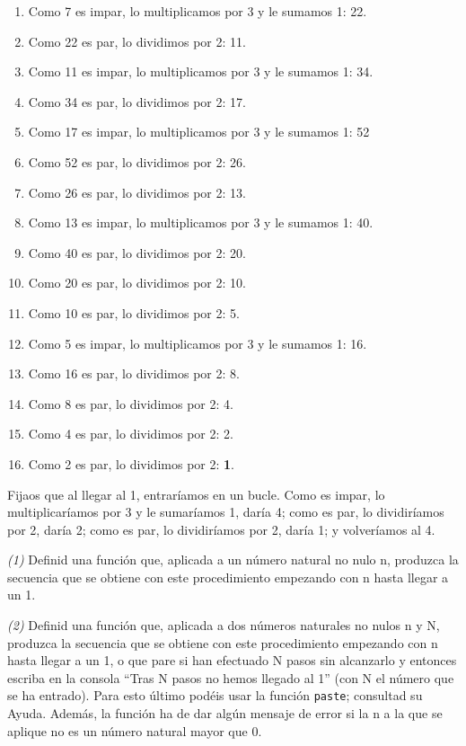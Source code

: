 \documentclass[]{book}
\theoremstyle{definition}
\theoremstyle{definition}
\theoremstyle{definition}
\theoremstyle{remark}
\begin{document}
\begin{enumerate}
\def\labelenumi{\arabic{enumi}.}
\item
  Como 7 es impar, lo multiplicamos por 3 y le sumamos 1: 22.
\item
  Como 22 es par, lo dividimos por 2: 11.
\item
  Como 11 es impar, lo multiplicamos por 3 y le sumamos 1: 34.
\item
  Como 34 es par, lo dividimos por 2: 17.
\item
  Como 17 es impar, lo multiplicamos por 3 y le sumamos 1: 52
\item
  Como 52 es par, lo dividimos por 2: 26.
\item
  Como 26 es par, lo dividimos por 2: 13.
\item
  Como 13 es impar, lo multiplicamos por 3 y le sumamos 1: 40.
\item
  Como 40 es par, lo dividimos por 2: 20.
\item
  Como 20 es par, lo dividimos por 2: 10.
\item
  Como 10 es par, lo dividimos por 2: 5.
\item
  Como 5 es impar, lo multiplicamos por 3 y le sumamos 1: 16.
\item
  Como 16 es par, lo dividimos por 2: 8.
\item
  Como 8 es par, lo dividimos por 2: 4.
\item
  Como 4 es par, lo dividimos por 2: 2.
\item
  Como 2 es par, lo dividimos por 2: \textbf{1}.
\end{enumerate}

Fijaos que al llegar al 1, entraríamos en un bucle. Como es impar, lo multiplicaríamos por 3 y le sumaríamos 1, daría 4; como es par, lo dividiríamos por 2, daría 2; como es par, lo dividiríamos por 2, daría 1; y volveríamos al 4.

\emph{(1)} Definid una función que, aplicada a un número natural no nulo n, produzca la secuencia que se obtiene con este procedimiento empezando con n hasta llegar a un 1.

\emph{(2)} Definid una función que, aplicada a dos números naturales no nulos n y N, produzca la secuencia que se obtiene con este procedimiento empezando con n hasta llegar a un 1, o que pare si han efectuado N pasos sin alcanzarlo y entonces escriba en la consola ``Tras N pasos no hemos llegado al 1'' (con N el número que se ha entrado). Para esto último podéis usar la función \texttt{paste}; consultad su Ayuda. Además, la función ha de dar algún mensaje de error si la n a la que se aplique no es un número natural mayor que 0.
\end{document}
